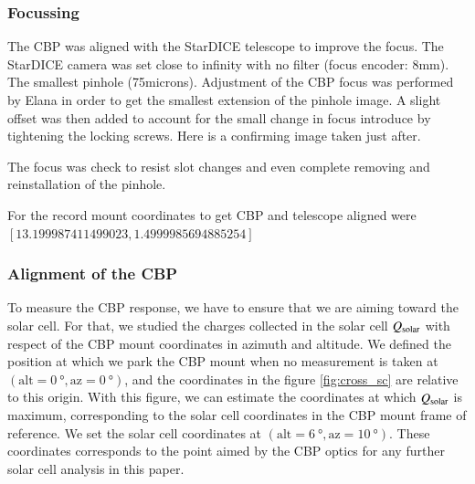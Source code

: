 
\subsubsection{Focussing}



The CBP was aligned with the StarDICE telescope to improve the focus. The
StarDICE camera was set close to infinity with no filter (focus encoder:
8mm). The smallest pinhole (75microns). Adjustment of the CBP focus was
performed by Elana in order to get the smallest extension of the pinhole
image. A slight offset was then added to account for the small change in focus
introduce by tightening the locking screws. Here is a confirming image taken
just after.

The focus was check to resist slot changes and even complete removing and
reinstallation of the pinhole.

For the record mount coordinates to get CBP and telescope aligned were
$[13.199987411499023, 1.4999985694885254]$



\subsubsection{Alignment of the CBP}

To measure the CBP response, we have to ensure that we are aiming toward the solar cell. For that, we studied the charges collected in the solar cell $Q_{\mathrm{solar}}$ with respect of the CBP mount coordinates in azimuth and altitude. We defined the position at which we park the CBP mount when no measurement is taken at $(\mathrm{alt} = \SI{0}{\degree}, \mathrm{az} = \SI{0}{\degree})$, and the coordinates in the figure \ref{fig:cross_sc} are relative to this origin. With this figure, we can estimate the coordinates at which $Q_{\mathrm{solar}}$ is maximum, corresponding to the solar cell coordinates in the CBP mount frame of reference. We set the solar cell coordinates at $(\mathrm{alt} = \SI{6}{\degree}, \mathrm{az} = \SI{10}{\degree})$. These coordinates corresponds to the point aimed by the CBP optics for any further solar cell analysis in this paper.

